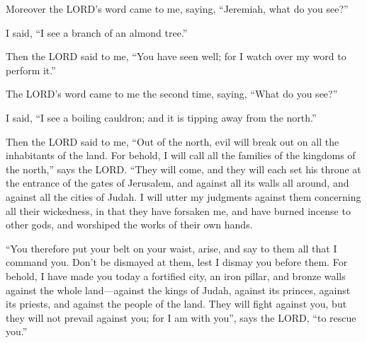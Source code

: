 \myverse{}Moreover the LORD’s word came to me, saying, “Jeremiah, what
do you see?”

I said, “I see a branch of an almond tree.”


\myverse{}Then the LORD said to me, “You have seen well; for I watch over
my word to perform it.”


\myverse{}The LORD’s word came to me the second time, saying, “What do
you see?”

I said, “I see a boiling cauldron; and it is tipping away from the north.”


\myverse{}Then the LORD said to me, “Out of the north, evil will break out on all the inhabitants of the land. \myverse{}For behold, I will call all the families of the kingdoms of the north,” says the LORD.  “They will come, and they will each set his throne at the entrance of the gates of Jerusalem, and against all its walls all around, and against all the cities of Judah. \myverse{}I will utter my judgments against them concerning all their wickedness, in that they have forsaken me, and have burned incense to other gods, and worshiped the works of their own hands.


\myverse{}“You therefore put your belt on your waist, arise, and say to them all that I command you. Don’t be dismayed at them, lest I dismay you before them. \myverse{}For behold, I have made you today a fortified city, an iron pillar, and bronze walls against the whole land—against the kings of Judah, against its princes, against its priests, and against the people of the land. \myverse{}They will fight against you, but they will not prevail against you; for I am with you”, says the LORD, “to rescue you.”


